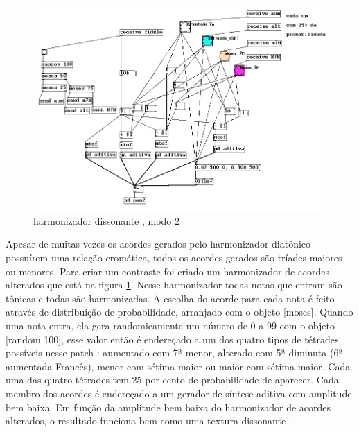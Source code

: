\documentclass[draft]{ppgmus}
\begin{document}
\begin{figure}
\includegraphics[scale=.5]{harm4}
\caption{harmonizador dissonante , modo 2}
\label{harm4}
\end{figure}

Apesar de muitas vezes os acordes gerados pelo harmonizador diatônico possuírem uma relação 
cromática, todos os acordes gerados são tríades maiores ou menores. Para criar um contraste 
foi criado um harmonizador de acordes alterados que está na figura \ref{harm4}. Nesse harmonizador todas notas 
que entram são tônicas e todas são harmonizadas. 
	A escolha do acorde para cada nota é feito através de distribuição de probabilidade, 
arranjado com o objeto [moses]. Quando uma nota entra, ela gera randomicamente um número de 0 
a 99 com o objeto [random 100], esse valor então é endereçado a um dos quatro tipos de tétrades 
possíveis nesse patch : aumentado com 7ª menor, alterado com 5ª diminuta (6ª aumentada Francês), 
menor com sétima maior ou maior com sétima maior. Cada uma das quatro tétrades tem 25 por cento 
de probabilidade de aparecer. Cada membro dos acordes é endereçado a um gerador de síntese aditiva 
com amplitude bem baixa. Em função da amplitude bem baixa do harmonizador de acordes alterados, o 
resultado funciona bem como uma textura dissonante .


\end{document}
